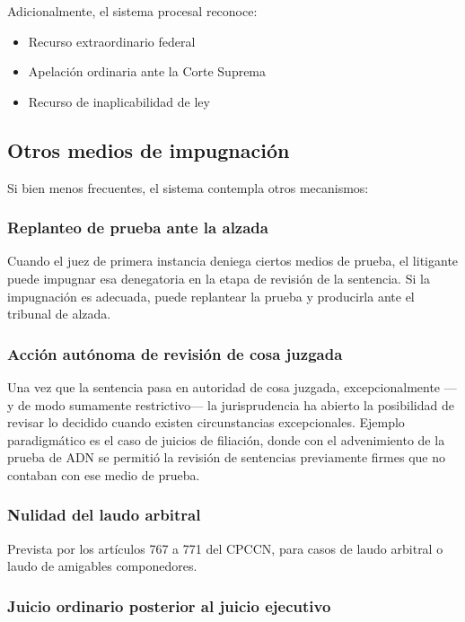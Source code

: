 \documentclass[12pt,oneside]{book}
\begin{document}
Adicionalmente, el sistema procesal reconoce:

\begin{itemize}
    \item Recurso extraordinario federal
    \item Apelación ordinaria ante la Corte Suprema
    \item Recurso de inaplicabilidad de ley
\end{itemize}

\subsection{Otros medios de impugnación}

Si bien menos frecuentes, el sistema contempla otros mecanismos:

\subsubsection{Replanteo de prueba ante la alzada}

Cuando el juez de primera instancia deniega ciertos medios de prueba, el litigante puede impugnar esa denegatoria en la etapa de revisión de la sentencia. Si la impugnación es adecuada, puede replantear la prueba y producirla ante el tribunal de alzada.

\subsubsection{Acción autónoma de revisión de cosa juzgada}

Una vez que la sentencia pasa en autoridad de cosa juzgada, excepcionalmente ---y de modo sumamente restrictivo--- la jurisprudencia ha abierto la posibilidad de revisar lo decidido cuando existen circunstancias excepcionales. Ejemplo paradigmático es el caso de juicios de filiación, donde con el advenimiento de la prueba de ADN se permitió la revisión de sentencias previamente firmes que no contaban con ese medio de prueba.

\subsubsection{Nulidad del laudo arbitral}

Prevista por los artículos 767 a 771 del CPCCN, para casos de laudo arbitral o laudo de amigables componedores.

\subsubsection{Juicio ordinario posterior al juicio ejecutivo}
\end{document}
